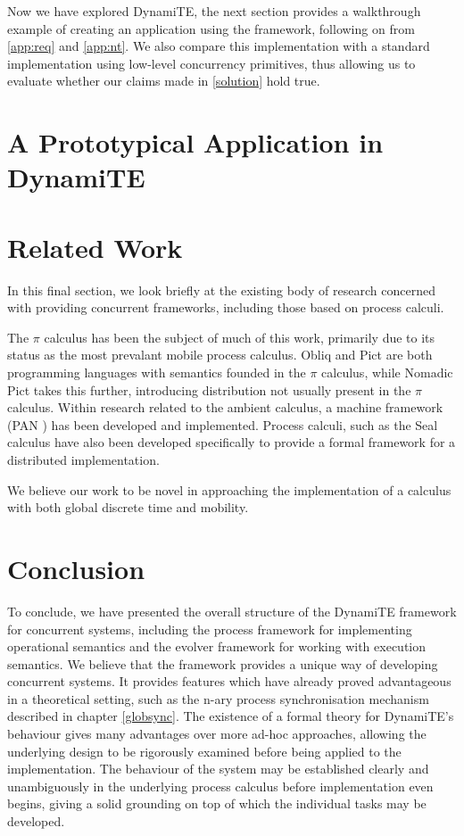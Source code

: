 Now we have explored DynamiTE, the next section provides a walkthrough
example of creating an application using the framework, following on
from \ref{app:req} and \ref{app:nt}.  We also compare this
implementation with a standard implementation using low-level
concurrency primitives, thus allowing us to evaluate whether our
claims made in \ref{solution} hold true.

\section{A Prototypical Application in DynamiTE}
\label{app:dynamite}
                                   
\section{Related Work}
\label{dyn:relatedwork}

In this final section, we look briefly at the existing body of
research concerned with providing concurrent frameworks, including
those based on process calculi.  

The $\pi$ calculus has been the subject of much of this work, primarily
due to its status as the most prevalant mobile process calculus.  Obliq
\cite{obliq} and Pict \cite{daveturner:phd} are both programming
languages with semantics founded in the $\pi$ calculus, while Nomadic
Pict \cite{wojciechowski:phd} takes this further, introducing
distribution not usually present in the $\pi$ calculus.  Within research
related to the ambient calculus, a machine framework (PAN
\cite{sangiorgi:safeambientsmachine}) has been developed and
implemented.  Process calculi, such as the Seal calculus \cite{seal}
have also been developed specifically to provide a formal framework for
a distributed implementation.

We believe our work to be novel in approaching the implementation of a
calculus with both global discrete time and mobility.

\section{Conclusion}

To conclude, we have presented the overall structure of the DynamiTE
framework for concurrent systems, including the process framework for
implementing operational semantics and the evolver framework for
working with execution semantics.  We believe that the framework
provides a unique way of developing concurrent systems.  It provides
features which have already proved advantageous in a theoretical
setting, such as the n-ary process synchronisation mechanism described
in chapter \ref{globsync}.  The existence of a formal theory for
DynamiTE's behaviour gives many advantages over more ad-hoc
approaches, allowing the underlying design to be rigorously examined
before being applied to the implementation.  The behaviour of the
system may be established clearly and unambiguously in the underlying
process calculus before implementation even begins, giving a solid
grounding on top of which the individual tasks may be developed.

